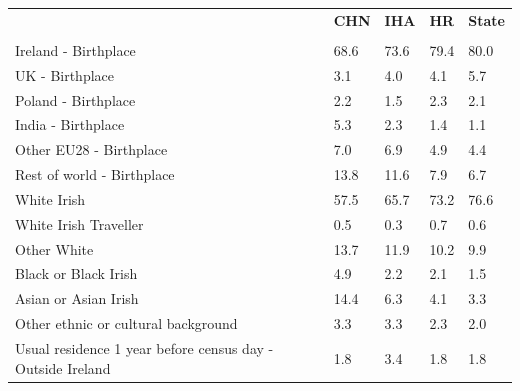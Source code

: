 \documentclass{article}
\begin{document}
\pagebreak
\begin{table}[h]	
\centering
		\begin{tabular}{KTTTT}
  \hline
& \textbf{CHN} & \textbf{IHA} & \textbf{HR}& \textbf{State}\\ 
  \hline
    \\ 
    \hline
Ireland - Birthplace & 68.6& 73.6& 79.4& 80.0\\
UK - Birthplace & 3.1& 4.0& 4.1& 5.7\\
Poland - Birthplace & 2.2& 1.5& 2.3& 2.1\\
India - Birthplace & 5.3& 2.3& 1.4& 1.1\\
Other EU28 - Birthplace & 7.0& 6.9& 4.9& 4.4\\
Rest of world - Birthplace & 13.8& 11.6&  7.9&  6.7\\
    \hline
White Irish & 57.5& 65.7& 73.2& 76.6\\
White Irish Traveller & 0.5& 0.3& 0.7& 0.6\\
Other White & 13.7& 11.9& 10.2&  9.9\\
Black or Black Irish & 4.9& 2.2& 2.1& 1.5\\
Asian or Asian Irish & 14.4&  6.3&  4.1&  3.3\\
Other ethnic or cultural background & 3.3& 3.3& 2.3& 2.0\\
    \hline
Usual residence 1 year before census day - Outside Ireland & 1.8& 3.4& 1.8& 1.8\\


\end{tabular}
\end{table}
\end{document}
